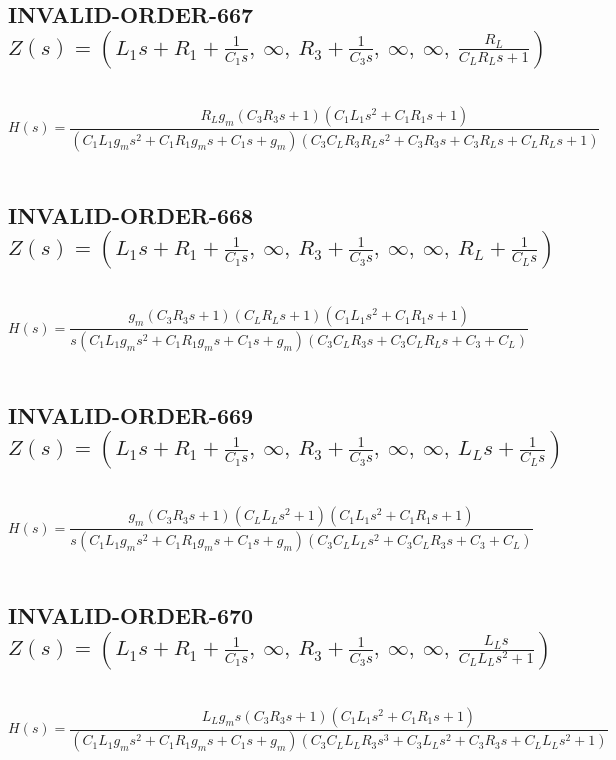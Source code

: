 \documentclass{article}
\begin{document}
\subsection{INVALID-ORDER-667 $Z(s) = \left( L_{1} s + R_{1} + \frac{1}{C_{1} s}, \  \infty, \  R_{3} + \frac{1}{C_{3} s}, \  \infty, \  \infty, \  \frac{R_{L}}{C_{L} R_{L} s + 1}\right)$ } \ 
\textbf{\[H(s) = \frac{R_{L} g_{m} \left(C_{3} R_{3} s + 1\right) \left(C_{1} L_{1} s^{2} + C_{1} R_{1} s + 1\right)}{\left(C_{1} L_{1} g_{m} s^{2} + C_{1} R_{1} g_{m} s + C_{1} s + g_{m}\right) \left(C_{3} C_{L} R_{3} R_{L} s^{2} + C_{3} R_{3} s + C_{3} R_{L} s + C_{L} R_{L} s + 1\right)}\] } \ 
\subsection{INVALID-ORDER-668 $Z(s) = \left( L_{1} s + R_{1} + \frac{1}{C_{1} s}, \  \infty, \  R_{3} + \frac{1}{C_{3} s}, \  \infty, \  \infty, \  R_{L} + \frac{1}{C_{L} s}\right)$ } \ 
\textbf{\[H(s) = \frac{g_{m} \left(C_{3} R_{3} s + 1\right) \left(C_{L} R_{L} s + 1\right) \left(C_{1} L_{1} s^{2} + C_{1} R_{1} s + 1\right)}{s \left(C_{1} L_{1} g_{m} s^{2} + C_{1} R_{1} g_{m} s + C_{1} s + g_{m}\right) \left(C_{3} C_{L} R_{3} s + C_{3} C_{L} R_{L} s + C_{3} + C_{L}\right)}\] } \ 
\subsection{INVALID-ORDER-669 $Z(s) = \left( L_{1} s + R_{1} + \frac{1}{C_{1} s}, \  \infty, \  R_{3} + \frac{1}{C_{3} s}, \  \infty, \  \infty, \  L_{L} s + \frac{1}{C_{L} s}\right)$ } \ 
\textbf{\[H(s) = \frac{g_{m} \left(C_{3} R_{3} s + 1\right) \left(C_{L} L_{L} s^{2} + 1\right) \left(C_{1} L_{1} s^{2} + C_{1} R_{1} s + 1\right)}{s \left(C_{1} L_{1} g_{m} s^{2} + C_{1} R_{1} g_{m} s + C_{1} s + g_{m}\right) \left(C_{3} C_{L} L_{L} s^{2} + C_{3} C_{L} R_{3} s + C_{3} + C_{L}\right)}\] } \ 
\subsection{INVALID-ORDER-670 $Z(s) = \left( L_{1} s + R_{1} + \frac{1}{C_{1} s}, \  \infty, \  R_{3} + \frac{1}{C_{3} s}, \  \infty, \  \infty, \  \frac{L_{L} s}{C_{L} L_{L} s^{2} + 1}\right)$ } \ 
\textbf{\[H(s) = \frac{L_{L} g_{m} s \left(C_{3} R_{3} s + 1\right) \left(C_{1} L_{1} s^{2} + C_{1} R_{1} s + 1\right)}{\left(C_{1} L_{1} g_{m} s^{2} + C_{1} R_{1} g_{m} s + C_{1} s + g_{m}\right) \left(C_{3} C_{L} L_{L} R_{3} s^{3} + C_{3} L_{L} s^{2} + C_{3} R_{3} s + C_{L} L_{L} s^{2} + 1\right)}\] } \ 
\end{document}
